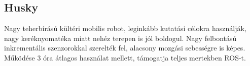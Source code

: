 \renewcommand{\xname}{Husky}
\renewcommand{\x}{0.99}
\renewcommand{\y}{0.67}
\renewcommand{\z}{0.39}
\renewcommand{\weight}{50 + 75}
\renewcommand{\img}{MobilisRobotok/clearpathrobotics/husky.jpg}
\renewcommand{\sources}{Forrás: https://robots.ros.org/husky}
\renewcommand{\captionn}{Négykerekű mobilis platform.}
\renewcommand{\watherProf}{Igen}
\renewcommand{\sebesseg}{3.6}
\renewcommand{\AcAndGy}{Igen}
\renewcommand{\GPS}{Igen}

\subsection*{Husky}
Nagy teherbírású kültéri mobilis robot, leginkább kutatási célokra használják, nagy keréknyomatéka miatt nehéz terepen is jól boldogul. Nagy felbontású inkrementális szenzorokkal szerelték fel, alacsony mozgási sebességre is képes. Működése 3 óra átlagos használat mellett, támogatja teljes mertekben ROS-t.

\renewcommand{\aspectratioPic}{0.6}


